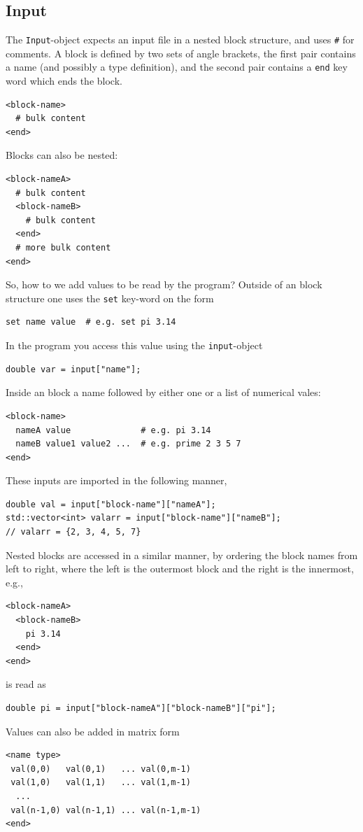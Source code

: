 \documentclass[11pt,a4paper]{report}
\begin{document}
\subsection{Input}
\label{sec:input}
The \texttt{Input}-object expects an input file in a nested block structure, and uses \texttt{\#} for comments. A block is defined by two sets of angle brackets, the first pair contains a name (and possibly a type definition), and the second pair contains a \texttt{end} key word which ends the block.
\begin{verbatim}
<block-name>
  # bulk content
<end>
\end{verbatim}
Blocks can also be nested:
\begin{verbatim}
<block-nameA>
  # bulk content
  <block-nameB>
    # bulk content
  <end>
  # more bulk content
<end>
\end{verbatim}
So, how to we add values to be read by the program? Outside of an block structure one uses the \texttt{set} key-word on the form
\begin{verbatim}
set name value  # e.g. set pi 3.14
\end{verbatim}
In the program you access this value using the \texttt{input}-object
\begin{verbatim}
double var = input["name"];
\end{verbatim}
Inside an block a name followed by either one or a list of numerical vales:
\begin{verbatim}
<block-name>
  nameA value              # e.g. pi 3.14 
  nameB value1 value2 ...  # e.g. prime 2 3 5 7 
<end>
\end{verbatim}
These inputs are imported in the following manner,
\begin{verbatim}
double val = input["block-name"]["nameA"];
std::vector<int> valarr = input["block-name"]["nameB"]; 
// valarr = {2, 3, 4, 5, 7}
\end{verbatim} 
Nested blocks are accessed in a similar manner, by ordering the block names from left to right, where the left is the outermost block and the right is the innermost, e.g.,
\begin{verbatim}
<block-nameA>
  <block-nameB>
    pi 3.14
  <end>
<end>
\end{verbatim}
is read as
\begin{verbatim}
double pi = input["block-nameA"]["block-nameB"]["pi"];
\end{verbatim}
Values can also be added in matrix form
\begin{verbatim}
<name type>
 val(0,0)   val(0,1)   ... val(0,m-1)
 val(1,0)   val(1,1)   ... val(1,m-1)
  ...
 val(n-1,0) val(n-1,1) ... val(n-1,m-1) 
<end>
\end{verbatim}
\end{document}
